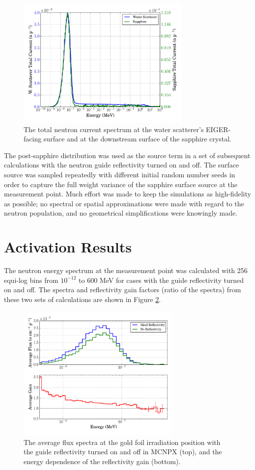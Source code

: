 \documentclass[a4paper,
              ]{jacow}
\begin{document}
\begin{figure}[!htb]
   \centering
   \includegraphics*[trim = 0mm 0mm 0mm 0mm, width=85mm]{graphics/specs.pdf}
   \caption{The total neutron current spectrum at the water scatterer's EIGER-facing surface and at the downstream surface of the sapphire crystal.}
   \label{specs}
\end{figure}

The post-sapphire distribution was used as the source term in a set of subsequent calculations with the neutron guide reflectivity turned on and off.  The surface source was sampled repeatedly with different initial random number seeds in order to capture the full weight variance of the sapphire surface source at the measurement point.  Much effort was made to keep the simulations as high-fidelity as possible; no spectral or spatial approximations were made with regard to the neutron population, and no geometrical simplifications were knowingly made.

\section{Activation Results}

The neutron energy spectrum at the measurement point was calculated with 256 equi-log bins from $10^{-12}$ to 600 MeV for cases with the guide reflectivity turned on and off.  The spectra and reflectivity gain factors (ratio of the spectra) from these two sets of calculations are shown in Figure \ref{gain}.  

\begin{figure}[!htb]
   \centering
   \includegraphics*[trim = 0mm 5mm 0mm 5mm, width=80mm]{graphics/gain.pdf}
   \caption{The average flux spectra at the gold foil irradiation position with the guide reflectivity turned on and off in MCNPX (top), and the energy dependence of the reflectivity gain (bottom).}
   \label{gain}
\end{figure}
\end{document}
